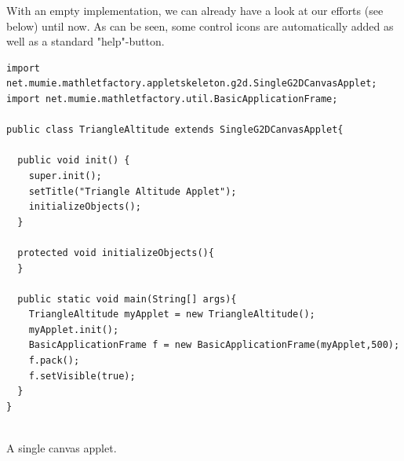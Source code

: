       With an empty implementation,  we can already have a look at our efforts 
      (see below) until now. As can be seen, some control 
      icons are automatically added as well as a standard \mbox{"help"-button}. 
        \begin{footnotesize}
        \begin{verbatim}
import net.mumie.mathletfactory.appletskeleton.g2d.SingleG2DCanvasApplet;
import net.mumie.mathletfactory.util.BasicApplicationFrame;

public class TriangleAltitude extends SingleG2DCanvasApplet{
  
  public void init() {
    super.init();
    setTitle("Triangle Altitude Applet");
    initializeObjects();
  }
  
  protected void initializeObjects(){
  }

  public static void main(String[] args){
    TriangleAltitude myApplet = new TriangleAltitude();
    myApplet.init();
    BasicApplicationFrame f = new BasicApplicationFrame(myApplet,500);
    f.pack();
    f.setVisible(true);
  }
}
        \end{verbatim}
        \end{footnotesize}
        \begin{center}
	  \\
        {\sf A single canvas applet.}\\
        \label{singlecanvas}
        \end{center}
